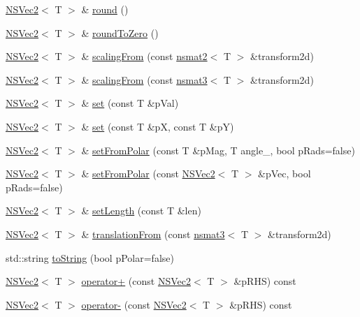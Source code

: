 \begin{DoxyCompactItemize}
\item 
\hyperlink{structNSVec2}{N\-S\-Vec2}$<$ T $>$ \& \hyperlink{structNSVec2_a4701680eaaacd9e85435655df4734021}{round} ()
\item 
\hyperlink{structNSVec2}{N\-S\-Vec2}$<$ T $>$ \& \hyperlink{structNSVec2_a45592c0ad2bd942ee4f5b1871424dcac}{round\-To\-Zero} ()
\item 
\hyperlink{structNSVec2}{N\-S\-Vec2}$<$ T $>$ \& \hyperlink{structNSVec2_aca8c80585471e69dd3905c5a014ab699}{scaling\-From} (const \hyperlink{structnsmat2}{nsmat2}$<$ T $>$ \&transform2d)
\item 
\hyperlink{structNSVec2}{N\-S\-Vec2}$<$ T $>$ \& \hyperlink{structNSVec2_a1f4ea1874faaa10c14ab8b5c0617ea1d}{scaling\-From} (const \hyperlink{structnsmat3}{nsmat3}$<$ T $>$ \&transform2d)
\item 
\hyperlink{structNSVec2}{N\-S\-Vec2}$<$ T $>$ \& \hyperlink{structNSVec2_a6c8e0628862782510eeb996cc7734d06}{set} (const T \&p\-Val)
\item 
\hyperlink{structNSVec2}{N\-S\-Vec2}$<$ T $>$ \& \hyperlink{structNSVec2_a57ca9e7d5d2001217de0993b70b6caf5}{set} (const T \&p\-X, const T \&p\-Y)
\item 
\hyperlink{structNSVec2}{N\-S\-Vec2}$<$ T $>$ \& \hyperlink{structNSVec2_af8026babdaef5b24945f3e45e10ce69d}{set\-From\-Polar} (const T \&p\-Mag, T angle\-\_\-, bool p\-Rads=false)
\item 
\hyperlink{structNSVec2}{N\-S\-Vec2}$<$ T $>$ \& \hyperlink{structNSVec2_a1b26ec6cef655c66c9c0faa1bb454831}{set\-From\-Polar} (const \hyperlink{structNSVec2}{N\-S\-Vec2}$<$ T $>$ \&p\-Vec, bool p\-Rads=false)
\item 
\hyperlink{structNSVec2}{N\-S\-Vec2}$<$ T $>$ \& \hyperlink{structNSVec2_ab20a567f7413f65cf90e6b85b5348959}{set\-Length} (const T \&len)
\item 
\hyperlink{structNSVec2}{N\-S\-Vec2}$<$ T $>$ \& \hyperlink{structNSVec2_adf3e56477642d9c7f9da4981c11759b6}{translation\-From} (const \hyperlink{structnsmat3}{nsmat3}$<$ T $>$ \&transform2d)
\item 
std\-::string \hyperlink{structNSVec2_aa7a2eeb1116a475bfca9d5720b03f5e0}{to\-String} (bool p\-Polar=false)
\item 
\hyperlink{structNSVec2}{N\-S\-Vec2}$<$ T $>$ \hyperlink{structNSVec2_affc96246dd111f33fd5e03329501e786}{operator+} (const \hyperlink{structNSVec2}{N\-S\-Vec2}$<$ T $>$ \&p\-R\-H\-S) const 
\item 
\hyperlink{structNSVec2}{N\-S\-Vec2}$<$ T $>$ \hyperlink{structNSVec2_a42e9ae0c953ff8ce06f2c812262d3add}{operator-\/} (const \hyperlink{structNSVec2}{N\-S\-Vec2}$<$ T $>$ \&p\-R\-H\-S) const 

\end{DoxyCompactItemize}
